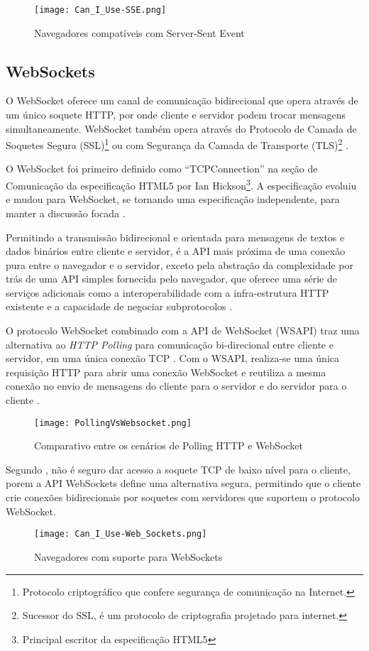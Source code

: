 \begin{figure}[!htb]
	\centering
	\caption{Navegadores compatíveis com Server-Sent Event}
	\texttt{[image: Can\_I\_Use-SSE.png]}
	\label{fig:sse}
\end{figure}

\subsection{WebSockets}

O WebSocket oferece um canal de comunicação bidirecional que opera através de um único soquete HTTP, por onde cliente e servidor podem trocar mensagens simultaneamente. WebSocket também opera através do Protocolo de Camada de Soquetes Segura (SSL)\footnote{Protocolo criptográfico que confere segurança de comunicação na Internet.} ou com Segurança da Camada de Transporte (TLS)\footnote{Sucessor do SSL, é um protocolo de criptografia projetado para internet.} \cite{lombardi2015websocket}.

O WebSocket foi primeiro definido como “TCPConnection” na seção de Comunicação da especificação HTML5 por Ian Hickson\footnote{Principal escritor da especificação HTML5}. A especificação evoluiu e mudou para WebSocket, se tornando uma especificação independente, para manter a discussão focada \cite{lubbers2011pro}.

Permitindo a transmissão bidirecional e orientada para mensagens de textos e dados binários entre cliente e servidor, é a API mais próxima de uma conexão pura entre o navegador e o servidor, exceto pela abstração da complexidade por trás de uma API simples fornecida pelo navegador, que oferece uma série de serviços adicionais como a interoperabilidade com a infra-estrutura HTTP existente e a capacidade de negociar subprotocolos \cite{grigorik2013high}.

O protocolo WebSocket combinado com a API de WebSocket (WSAPI) traz uma alternativa ao \emph{HTTP Polling} para comunicação bi-direcional entre cliente e servidor, em uma única conexão TCP \cite{Saint-Andre2011}. Com o WSAPI, realiza-se uma única requisição HTTP para abrir uma conexão WebSocket  e reutiliza a mesma conexão no envio de mensagens do cliente para o servidor e do servidor para o cliente \cite{Wang2013}.

\begin{figure}[!htb]
	\centering
	\caption{Comparativo entre os cenários de Polling HTTP e WebSocket}
	\texttt{[image: PollingVsWebsocket.png]}
	\label{fig:pollingVSwebsocket}
\end{figure}

Segundo , não é seguro dar acesso a soquete TCP de baixo nível para o cliente, porem a API WebSockets define uma alternativa segura, permitindo que o cliente crie conexões bidirecionais por soquetes com servidores que suportem o protocolo WebSocket.

\begin{figure}[!htb]
	\centering
	\caption{Navegadores com suporte para WebSockets}
	\texttt{[image: Can\_I\_Use-Web\_Sockets.png]}
	\label{fig:websocket}
\end{figure}
